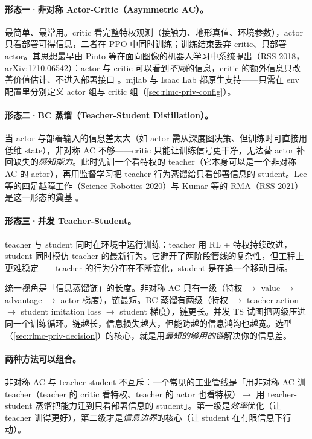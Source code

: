 \paragraph{形态一·非对称 Actor-Critic（Asymmetric AC）。} 最简单、最常用。critic 看完整特权观测（接触力、地形真值、环境参数），actor 只看部署可得信息，二者在 PPO 中同时训练；训练结束丢弃 critic、只部署 actor。其思想最早由 Pinto 等在面向图像的机器人学习中系统提出（RSS 2018，arXiv:1710.06542）：actor 与 critic 可以看到\emph{不同}的信息，critic 的额外信息只改善价值估计、不进入部署接口 \cite{pinto2018asymmetric}。mjlab 与 Isaac Lab 都原生支持——只需在 env 配置里分别定义 actor 组与 critic 组（\cref{sec:rlmc-priv-config}）。

\paragraph{形态二·BC 蒸馏（Teacher-Student Distillation）。} 当 actor 与部署输入的信息差太大（如 actor 需从深度图决策、但训练时可直接用低维 state），非对称 AC 不够——critic 只能让训练信号更干净，无法替 actor 补回缺失的\emph{感知能力}。此时先训一个看特权的 teacher（它本身可以是一个非对称 AC 的 actor），再用监督学习把 teacher 行为蒸馏给只看部署信息的 student。Lee 等的四足越障工作（Science Robotics 2020）与 Kumar 等的 RMA（RSS 2021）是这一形态的奠基 \cite{lee2020quadruped,kumar2021rma}。

\paragraph{形态三·并发 Teacher-Student。} teacher 与 student 同时在环境中运行训练：teacher 用 RL + 特权持续改进，student 同时模仿 teacher 的最新行为。它避开了两阶段管线的复杂性，但工程上更难稳定——teacher 的行为分布在不断变化，student 是在追一个移动目标。

\begin{insight}[三种形态 = 信息蒸馏链的长度]\label{ins:rlmc-priv-chain}
统一视角是「信息蒸馏链」的长度。非对称 AC 只有一级（特权 $\to$ value $\to$ advantage $\to$ actor 梯度），链最短。BC 蒸馏有两级（特权 $\to$ teacher action $\to$ student imitation loss $\to$ student 梯度），链更长。并发 TS 试图把两级压进同一个训练循环。链越长，信息损失越大，但能跨越的信息鸿沟也越宽。选型（\cref{sec:rlmc-priv-decision}）的核心，就是用\emph{最短的够用的链}解决你的信息差。
\end{insight}

\paragraph{两种方法可以组合。} 非对称 AC 与 teacher-student 不互斥：一个常见的工业管线是「用非对称 AC 训 teacher（teacher 的 critic 看特权、teacher 的 actor 也看特权）$\to$ 用 teacher-student 蒸馏把能力迁到只看部署信息的 student」。第一级是\emph{效率}优化（让 teacher 训得更好），第二级才是\emph{信息边界}的核心（让 student 在有限信息下行动）。

